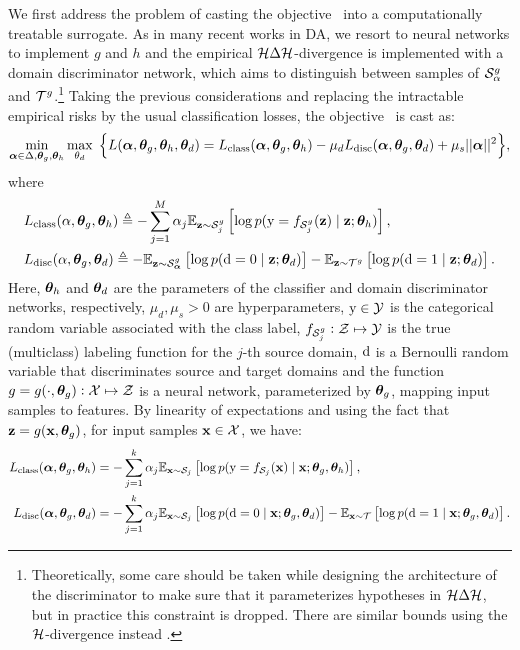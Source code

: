 We first address the problem of casting the objective~ into a computationally treatable surrogate. As in many recent works in DA, we resort to neural networks to implement $g$ and $h$ and the empirical ${\mathcal{H}} \Delta {\mathcal{H}}$-divergence is implemented with a domain discriminator network, which aims to distinguish between samples of ${\mathcal{S}}_\alpha^g$ and ${\mathcal{T}}^g$.\footnote[1]{Theoretically, some care should be taken while designing the architecture of the discriminator to make sure that it parameterizes hypotheses in ${\mathcal{H}} \Delta {\mathcal{H}}$, but in practice this constraint is dropped. There are similar bounds using the ${\mathcal{H}}$-divergence instead \citep{Sebag2019}.} Taking the previous considerations and replacing the intractable empirical risks by the usual classification losses, the objective~ is cast as:
\begin{equation}
	\label{eq:moda_obj}
    \min_{{\bm{\alpha}} \in \Delta, {\bm{\theta}}_g, {\bm{\theta}}_h} \max_{\theta_d} \; \Big\{ L({\bm{\alpha}}, {\bm{\theta}}_g, {\bm{\theta}}_h, {\bm{\theta}}_d) = L_\text{class}({\bm{\alpha}}, {\bm{\theta}}_g, {\bm{\theta}}_h) - \mu_d L_\text{disc}({\bm{\alpha}}, {\bm{\theta}}_g, {\bm{\theta}}_d) + \mu_s ||{\bm{\alpha}}||^2 \Big\},
\end{equation}
where
\begin{align}
    &L_\text{class}(\alpha, {\bm{\theta}}_g, {\bm{\theta}}_h) \triangleq -\sum_{j=1}^M \alpha_j\mathbb{E}_{{\mathbf{z}} \sim {\mathcal{S}}_j^g} \left[\log p({\textnormal{y}}=f_{{\mathcal{S}}_j^g}({\mathbf{z}}) \mid {\mathbf{z}}; {\bm{\theta}}_h)\right], \\
    &L_\text{disc}(\alpha, {\bm{\theta}}_g, {\bm{\theta}}_d) \triangleq -\mathbb{E}_{{\mathbf{z}} \sim {\mathcal{S}}_{{\bm{\alpha}}}^g} \left[ \log p({\textnormal{d}}=0 \mid {\mathbf{z}}; {\bm{\theta}}_d) \right] - \mathbb{E}_{{\mathbf{z}} \sim {\mathcal{T}}^g} \left[ \log p({\textnormal{d}}=1 \mid {\mathbf{z}}; {\bm{\theta}}_d) \right].
\end{align}
Here, ${\bm{\theta}}_h$ and ${\bm{\theta}}_d$ are the parameters of the classifier and domain discriminator networks, respectively, $\mu_d, \mu_s > 0$ are hyperparameters, ${\textnormal{y}} \in {\mathcal{Y}}$ is the categorical random variable associated with the class label, $f_{{\mathcal{S}}_j^g}: {\mathcal{Z}} \mapsto {\mathcal{Y}}$ is the true (multiclass) labeling function for the $j$-th source domain, ${\textnormal{d}}$ is a Bernoulli random variable that discriminates source and target domains and the function $g = g(\cdot, {\bm{\theta}}_g): {\mathcal{X}} \mapsto {\mathcal{Z}}$ is a neural network, parameterized by ${\bm{\theta}}_g$, mapping input samples to features. By linearity of expectations and using the fact that ${\mathbf{z}} = g({\mathbf{x}}, {\bm{\theta}}_g)$, for input samples ${\mathbf{x}} \in {\mathcal{X}}$, we have:
\begin{align}
    \label{eq:loss_class}
    L_\text{class}(\valpha, \vtheta_g, \vtheta_h) &= -\sum_{j=1}^k \alpha_j\E_{\rvx \sim \gS_j} \left[ \log p(\ry=f_{\gS_j}(\rvx) \mid \rvx; \vtheta_g, \vtheta_h) \right], \\
    \allowdisplaybreaks
    \label{eq:loss_disc}
    L_\text{disc}(\valpha, \vtheta_g, \vtheta_d) &= -\sum_{j=1}^k \alpha_j\E_{\rvx \sim \gS_j} \left[ \log p(\rd=0 \mid \rvx; \vtheta_g, \vtheta_d) \right] - \E_{\rvx \sim \gT} \left[ \log p(\rd=1 \mid \rvx; \vtheta_g, \vtheta_d) \right] .
\end{align}
